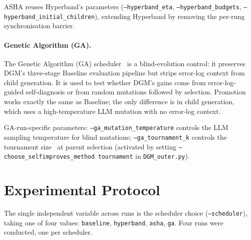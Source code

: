 ASHA reuses Hyperband's parameters
(\texttt{--hyperband\bk\_eta}, \texttt{--hyperband\bk\_budgets},
\texttt{--hyperband\bk\_initial\bk\_children}), extending Hyperband
by removing the per-rung synchronisation barrier.

\paragraph{Genetic Algorithm (GA).}
The Genetic Algorithm (GA) scheduler~\cite{Holland:75} is a
blind-evolution control: it preserves DGM's three-stage Baseline
evaluation pipeline but strips error-log context from child
generation. It is used to test whether
DGM's gains come from error-log-guided self-diagnosis or from random
mutations followed by selection. Promotion works exactly the same as
Baseline; the only difference is in child generation, which uses a
high-temperature LLM mutation with no error-log context.

GA-run-specific parameters: \texttt{--ga\_mutation\_temperature}
controls the LLM sampling temperature for blind mutations;
\texttt{--ga\_tournament\_k} controls the tournament
size~\cite{Miller:95} at parent selection (activated by setting
\texttt{--choose\_selfimproves\_method tournament} in
\texttt{DGM\_outer.py}).

\section{Experimental Protocol}
\label{sec:protocol}

The single independent variable across runs is the scheduler choice
(\texttt{--scheduler}), taking one of four values: \texttt{baseline},
\texttt{hyperband}, \texttt{asha}, \texttt{ga}. Four runs were
conducted, one per scheduler.

